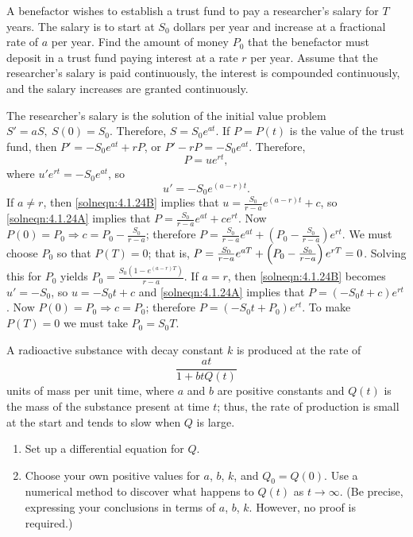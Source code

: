 \documentclass{ximera}
\begin{document}
\begin{problem}\label{exer:4.1.24} A benefactor wishes to establish a trust fund to
pay a researcher's salary for $T$ years. The salary is to start at
$S_0$ dollars per year and increase at a fractional rate of $a$ per
year. Find the amount of money $P_0$ that the benefactor must deposit
in a trust fund paying interest at a rate $r$ per year. Assume that
the researcher's salary is paid continuously, the interest is
compounded continuously, and the salary increases are granted
continuously.
\begin{solution}
The researcher's salary is the solution of the initial value problem
$S'=aS,\ S(0)=S_0$. Therefore, $S=S_0e^{at}$. If $P=P(t)$ is the value
of the trust fund, then $P'=-S_0e^{at}+rP$, or $P'-rP=-S_0e^{at}$.
Therefore, 
\begin{equation}\label{solneqn:4.1.24A}
P=ue^{rt},  
\end{equation}
where $u'e^{rt}=-S_0e^{at}$,
 so 
\begin{equation}\label{solneqn:4.1.24B}
u'=-S_0e^{(a-r)t}.  
\end{equation}
If $a\ne r$, then \ref{solneqn:4.1.24B} implies that
$u=\frac{S_0}{r-a}e^{(a-r)t}+c$, so \ref{solneqn:4.1.24A} implies that
$P=\frac{S_0}{r-a}e^{at}+ce^{rt}$. Now $P(0)=P_0\Rightarrow
c=P_0-\frac{S_0}{r-a}$; therefore
$P=\frac{S_0}{r-a}e^{at}+\left(P_0-\frac{S_0}{r-a}\right)e^{rt}$.
We must choose $P_0$ so that $P(T)=0$; that is,
$P=\frac{S_0}{r-a}e^{aT}+\left(P_0-{S_0\over r-a}\right)e^{rT}=0$.
Solving this for $P_0$ yields
$P_0=\frac{S_0(1-e^{(a-r)T})}{r-a}$.
If $a=r$, then \ref{solneqn:4.1.24B} becomes
$u'=-S_0$, so $u=-S_0t+c$ and \ref{solneqn:4.1.24A} implies that
$P=(-S_0t+c)e^{rt}$. Now $P(0)=P_0\Rightarrow
c=P_0$; therefore
$P=(-S_0t+P_0)e^{rt}$.
To make $P(T)=0$ we must take $P_0=S_0T$.
\end{solution}
\end{problem}

\begin{problem}\label{exer:4.1.25}  
A radioactive substance with decay constant $k$ is produced
at the rate of
$$
\frac{at}{1+btQ(t)}
$$
 units of mass per unit time, where
$a$ and $b$ are positive constants and $Q(t)$ is the mass of the
substance present at time $t$;   thus, the rate of production is small
at the start
 and tends to slow when $Q$ is large.
\begin{enumerate}
\item %
Set up a differential equation for $Q$.
\item %
Choose your own positive values for $a$, $b$, $k$, and
$Q_0=Q(0)$.
Use a numerical method
to discover what happens to $Q(t)$
as $t\to\infty$. (Be precise, expressing your conclusions in terms of
$a$, $b$, $k$. However,  no proof is required.)
\end{enumerate}
\end{problem}
\end{document}
